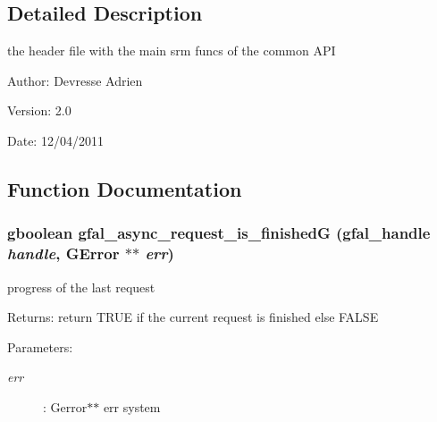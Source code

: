 \subsection{Detailed Description}
the header file with the main srm funcs of the common API 

\begin{Desc}
\item[Author:]Devresse Adrien \end{Desc}
\begin{Desc}
\item[Version:]2.0 \end{Desc}
\begin{Desc}
\item[Date:]12/04/2011 \end{Desc}


\subsection{Function Documentation}
\subsubsection{\setlength{\rightskip}{0pt plus 5cm}gboolean gfal\_\-async\_\-request\_\-is\_\-finished\-G (gfal\_\-handle {\em handle}, GError $\ast$$\ast$ {\em err})}\label{gfal__common__srm_8h_b628e9ad3599f656f022f9101020f519}


progress of the last request 

\begin{Desc}
\item[Returns:]return TRUE if the current request is finished else FALSE \end{Desc}
\begin{Desc}
\item[Parameters:]
\begin{description}
\item[{\em err}]: Gerror$\ast$$\ast$ err system \end{description}
\end{Desc}
